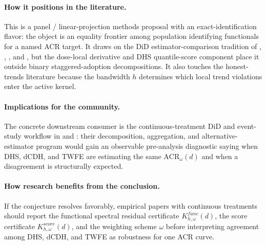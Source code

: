 \documentclass[11pt]{article}
\theoremstyle{definition}
\theoremstyle{plain}
\theoremstyle{remark}
\begin{document}
\paragraph{How it positions in the literature.}
This is a panel / linear-projection methods proposal with an exact-identification flavor: the object is an equality frontier among population identifying functionals for a named ACR target. It draws on the DiD estimator-comparison tradition of \citet{deChaisemartinDHaultfoeuille2020}, \citet{GoodmanBacon2021}, \citet{SunAbraham2021}, and \citet{BorusyakJaravelSpiess2024}, but the dose-local derivative and DHS quantile-score component place it outside binary staggered-adoption decompositions. It also touches the honest-trends literature because the bandwidth \(h\) determines which local trend violations enter the active kernel.

\paragraph{Implications for the community.}
The concrete downstream consumer is the continuous-treatment DiD and event-study workflow in \citet{CallawayGoodmanBaconSantAnna2024} and \citet{CallawayGoodmanBaconSantAnna2024EventStudies}: their decomposition, aggregation, and alternative-estimator program would gain an observable pre-analysis diagnostic saying when DHS, dCDH, and TWFE are estimating the same \(\mathrm{ACR}_\omega(d)\) and when a disagreement is structurally expected.

\paragraph{How research benefits from the conclusion.}
If the conjecture resolves favorably, empirical papers with continuous treatments should report the functional spectral residual certificate \(K^{func}_{h,\omega}(d)\), the score certificate \(K^{score}_{h,\omega}(d)\), and the weighting scheme \(\omega\) before interpreting agreement among DHS, dCDH, and TWFE as robustness for one ACR curve.
\end{document}

